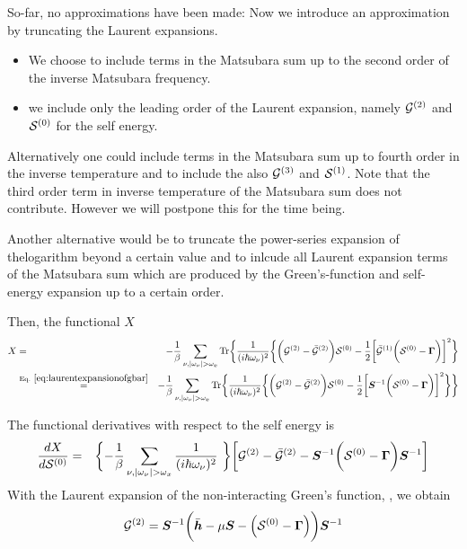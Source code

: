 \documentclass[11pt,a4paper]{report}
\begin{document}
So-far, no approximations have been made: Now we introduce an
approximation by truncating the Laurent expansions.
\begin{itemize}
\item We choose to include terms in the Matsubara sum up to the second
  order of the inverse Matsubara frequency.
\item we include only the leading order of the Laurent expansion, namely
  $\mathcal{\bm{G}}^{(2)}$ and $\mathcal{\bm{S}}^{(0)}$ for the self
  energy.
\end{itemize}

Alternatively one could include terms in the Matsubara sum up to
fourth order in the inverse temperature and to include the also
$\mathcal{\bm{G}}^{(3)}$ and $\mathcal{\bm{S}}^{(1)}$. Note that the
third order term in inverse temperature of the Matsubara sum does not
contribute. However we will postpone this for the time being.

Another alternative would be to truncate the power-series expansion of
thelogarithm beyond a certain value and to inlcude all Laurent
expansion terms of the Matsubara sum which are produced by the
Green's-function and self-energy expansion up to a certain order.

Then, the functional $X$
\begin{eqnarray}
 X&=&-\frac{1}{\beta}\sum_{\nu,|\omega_\nu|>\omega_x}\Tr\biggl\lbrace
\frac{1}{(i\hbar\omega_\nu)^2}
\biggl\lbrace
\biggl(
\mathcal{\mat{G}}^{(2)}-\bar{\mathcal{\mat{G}}}^{(2)}
\biggr)
\mathcal{\mat{S}}^{(0)}
-
\frac{1}{2}
\biggl[
\bar{\mathcal{\mat{G}}}^{(1)}
\biggl(\mathcal{\mat{S}}^{(0)}-\mat{\Gamma}\biggr)
\biggr]^2\biggr\rbrace
%
\nonumber\\
&\eqrel{eq:laurentexpansionofgbar}{=}&
-\frac{1}{\beta}\sum_{\nu,|\omega_\nu|>\omega_x}\Tr\biggl\lbrace
\frac{1}{(i\hbar\omega_\nu)^2}
\biggl\lbrace
\biggl(
\mathcal{\mat{G}}^{(2)}-\bar{\mathcal{\mat{G}}}^{(2)}
\biggr)
\mathcal{\mat{S}}^{(0)}
-
\frac{1}{2}
\biggl[
\mat{S}^{-1}
\biggl(\mathcal{\mat{S}}^{(0)}-\mat{\Gamma}\biggr)
\biggr]^2\biggr\rbrace
\biggr\rbrace
\end{eqnarray}

The functional derivatives with respect to the self energy is
\begin{eqnarray}
\frac{dX}{d\mathcal{\mat{S}}^{(0)}}
&=&
\biggl\lbrace
-\frac{1}{\beta}\sum_{\nu,|\omega_\nu|>\omega_x}\frac{1}{(i\hbar\omega_\nu)^2}\
\biggr\rbrace
\biggl[
\mathcal{\mat{G}}^{(2)}-\bar{\mathcal{\mat{G}}}^{(2)}
-
\mat{S}^{-1}\biggl(\mathcal{\mat{S}}^{(0)}-\mat{\Gamma}\biggr)\mat{S}^{-1}
\biggr]
\end{eqnarray}
With the Laurent expansion of the non-interacting Green's function,
\eq{eq:laurentexpansionofgbar}, we obtain
\begin{eqnarray}
\mathcal{\bm{G}}^{(2)}=\bm{S}^{-1}
\biggl(\bar{\bm{h}}-\mu\bm{S}
-\Bigl(\mathcal{\bm{S}}^{(0)}-\bm{\Gamma}\Bigr)\biggr)
\bm{S}^{-1}
\end{eqnarray}
\end{document}
